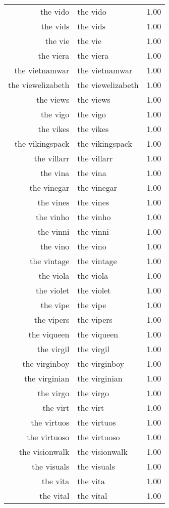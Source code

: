\begin{table}[ht]
\begin{tabular}{rlr}
  the vido & the vido & 1.00 \\ 
  the vids & the vids & 1.00 \\ 
  the vie & the vie & 1.00 \\ 
  the viera & the viera & 1.00 \\ 
  the vietnamwar & the vietnamwar & 1.00 \\ 
  the viewelizabeth & the viewelizabeth & 1.00 \\ 
  the views & the views & 1.00 \\ 
  the vigo & the vigo & 1.00 \\ 
  the vikes & the vikes & 1.00 \\ 
  the vikingspack & the vikingspack & 1.00 \\ 
  the villarr & the villarr & 1.00 \\ 
  the vina & the vina & 1.00 \\ 
  the vinegar & the vinegar & 1.00 \\ 
  the vines & the vines & 1.00 \\ 
  the vinho & the vinho & 1.00 \\ 
  the vinni & the vinni & 1.00 \\ 
  the vino & the vino & 1.00 \\ 
  the vintage & the vintage & 1.00 \\ 
  the viola & the viola & 1.00 \\ 
  the violet & the violet & 1.00 \\ 
  the vipe & the vipe & 1.00 \\ 
  the vipers & the vipers & 1.00 \\ 
  the viqueen & the viqueen & 1.00 \\ 
  the virgil & the virgil & 1.00 \\ 
  the virginboy & the virginboy & 1.00 \\ 
  the virginian & the virginian & 1.00 \\ 
  the virgo & the virgo & 1.00 \\ 
  the virt & the virt & 1.00 \\ 
  the virtuos & the virtuos & 1.00 \\ 
  the virtuoso & the virtuoso & 1.00 \\ 
  the visionwalk & the visionwalk & 1.00 \\ 
  the visuals & the visuals & 1.00 \\ 
  the vita & the vita & 1.00 \\ 
  the vital & the vital & 1.00 \\ 

\end{tabular}
\end{table}
